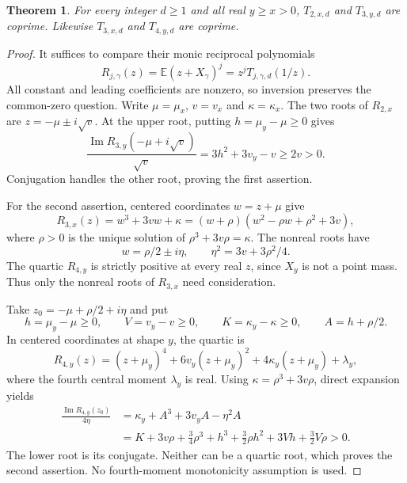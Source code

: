 \documentclass[11pt]{article}
\newtheorem{theorem}{Theorem}
\begin{document}
\begin{theorem}\label{thm:ordered-initial}
For every integer $d\ge1$ and all real $y\ge x>0$,
$T_{2,x,d}$ and $T_{3,y,d}$ are coprime.
Likewise $T_{3,x,d}$ and $T_{4,y,d}$ are coprime.
\end{theorem}
\begin{proof}
It suffices to compare their monic reciprocal polynomials
\[
 R_{j,\gamma}(z)=\mathbb E(z+X_\gamma)^j
                =z^jT_{j,\gamma,d}(1/z).
\]
All constant and leading coefficients are nonzero, so inversion
preserves the common-zero question. Write
$\mu=\mu_x$, $v=v_x$ and $\kappa=\kappa_x$.
The two roots of $R_{2,x}$ are $z=-\mu\pm i\sqrt v$.
At the upper root, putting $h=\mu_y-\mu\ge0$ gives
\[
 \frac{\operatorname{Im}R_{3,y}(-\mu+i\sqrt v)}{\sqrt v}
     =3h^2+3v_y-v\ge2v>0 .
\]
Conjugation handles the other root, proving the first assertion.

For the second assertion, centered coordinates $w=z+\mu$ give
\[
 R_{3,x}(z)=w^3+3vw+\kappa
          =(w+\rho)(w^2-\rho w+\rho^2+3v),
\]
where $\rho>0$ is the unique solution of
$\rho^3+3v\rho=\kappa$.
The nonreal roots have
\[
 w=\rho/2\pm i\eta,\qquad
 \eta^2=3v+3\rho^2/4.
\]
The quartic $R_{4,y}$ is strictly positive at every real $z$,
since $X_y$ is not a point mass. Thus only the nonreal roots of
$R_{3,x}$ need consideration.

Take $z_0=-\mu+\rho/2+i\eta$ and put
\[
 h=\mu_y-\mu\ge0,\qquad V=v_y-v\ge0,\qquad
 K=\kappa_y-\kappa\ge0,\qquad A=h+\rho/2.
\]
In centered coordinates at shape $y$, the quartic is
\[
 R_{4,y}(z)=
 (z+\mu_y)^4+6v_y(z+\mu_y)^2+
 4\kappa_y(z+\mu_y)+\lambda_y,
\]
where the fourth central moment $\lambda_y$ is real.
Using $\kappa=\rho^3+3v\rho$, direct expansion yields
\[
 \begin{split}
 \frac{\operatorname{Im}R_{4,y}(z_0)}{4\eta}
 &=\kappa_y+A^3+3v_yA-\eta^2A\\
 &=K+3v\rho+\frac34\rho^3+h^3+\frac32\rho h^2
                       +3Vh+\frac32V\rho>0.
 \end{split}
\]
The lower root is its conjugate. Neither can be a quartic root,
which proves the second assertion. No fourth-moment monotonicity
assumption is used.
\end{proof}
\end{document}
